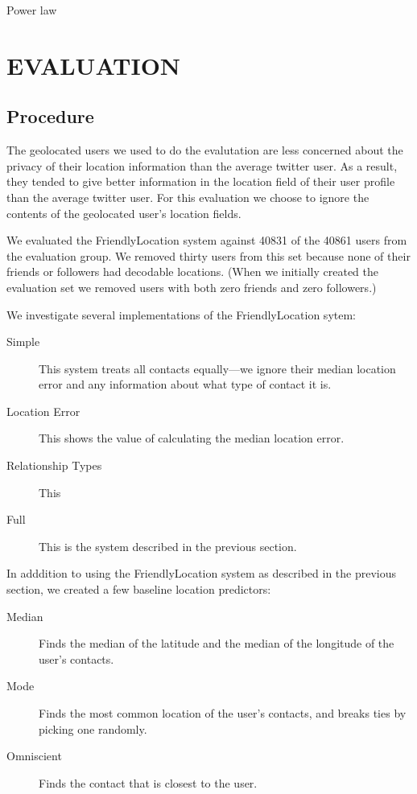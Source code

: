 \documentclass{sig-alternate}
\begin{document}
Power law
\begin{figure}
\centering
{}
\caption{}
\label{fig:EdgeTypesMdist}
\end{figure}



\section{EVALUATION}
\subsection{Procedure}
The geolocated users we used to do the evalutation are less concerned about the
privacy of their location information than the average twitter user.
As a result, they tended to give better information in the location field of
their user profile than the average twitter user.
For this evaluation we choose to ignore the contents of the geolocated user's
location fields.

We evaluated the FriendlyLocation system against 40831 of the 40861 users from the evaluation group.
We removed thirty users from this set because none of their friends or
followers had decodable locations.
(When we initially created the evaluation
set we removed users with both zero friends and zero followers.)

We investigate several implementations of the FriendlyLocation sytem:
\begin{description}
\item[Simple] This system treats all contacts equally---we ignore their median location error and any information about what type of contact it is.
\item[Location Error] This shows the value of calculating the median location error.
\item[Relationship Types] This 
\item[Full] This is the system described in the previous section.
\end{description}

In adddition to using the FriendlyLocation system as described in the previous section, we created a few baseline location predictors:
\begin{description}
\item[Median] Finds the median of the latitude and the median of the longitude of the user's contacts.
\item[Mode] Finds the most common location of the user's contacts, and breaks ties by picking one randomly.
\item[Omniscient] Finds the contact that is closest to the user.
\end{description}
\end{document}
